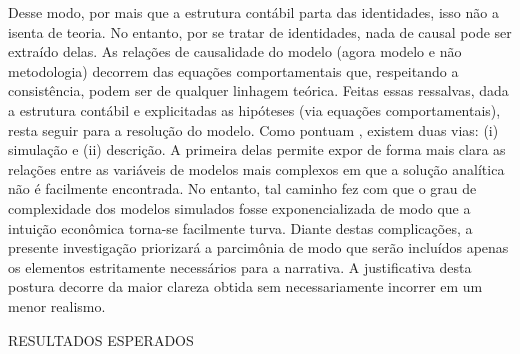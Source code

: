 Desse modo, por mais que a estrutura contábil parta das identidades, isso não a isenta de teoria. No entanto, por se tratar de identidades, nada de causal pode ser extraído delas. As relações de causalidade do modelo (agora modelo e não metodologia) decorrem das equações comportamentais que, respeitando a consistência, podem ser de qualquer linhagem teórica. Feitas essas ressalvas, dada a estrutura contábil e explicitadas as hipóteses (via equações comportamentais), resta seguir para a resolução do modelo. Como pontuam \textcite{caverzasi_stock-flow_2013}, existem duas vias: (i) simulação e (ii) descrição. A primeira delas permite expor de forma mais clara as relações entre as variáveis de modelos mais complexos em que a solução analítica não é facilmente encontrada. No entanto, tal caminho fez com que o grau de complexidade dos modelos simulados fosse exponencializada de modo que a intuição econômica torna-se facilmente turva. Diante destas complicações, a presente investigação priorizará a parcimônia de modo que serão incluídos apenas os elementos estritamente necessários para a narrativa. A justificativa desta postura decorre da maior clareza obtida sem necessariamente incorrer em um menor realismo. 

RESULTADOS ESPERADOS